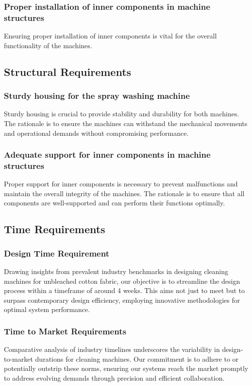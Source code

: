 \documentclass[12pt]{article} %
\begin{document}
 \subsubsection{Proper installation of inner components in machine structures} Ensuring proper installation of inner components is vital for the overall functionality of the machines.
 
\hspace{1cm}
\subsection{Structural Requirements}

 \subsubsection{Sturdy housing for the spray washing machine} Sturdy housing is crucial to provide stability and durability for both machines. The rationale is to ensure the machines can withstand the mechanical movements and operational demands without compromising performance.

 
 \subsubsection{Adequate support for inner components in machine structures} Proper support for inner components is necessary to prevent malfunctions and maintain the overall integrity of the machines. The rationale is to ensure that all components are well-supported and can perform their functions optimally.

\clearpage

\subsection{Time Requirements}

 \subsubsection{Design Time Requirement} Drawing insights from prevalent industry benchmarks in designing cleaning machines for unbleached cotton fabric, our objective is to streamline the design process within a timeframe of around 4 weeks. This aims not just to meet but to surpass contemporary design efficiency, employing innovative methodologies for optimal system performance.

 
 \subsubsection{Time to Market Requirements} Comparative analysis of industry timelines underscores the variability in design-to-market durations for cleaning machines. Our commitment is to adhere to or potentially outstrip these norms, ensuring our systems reach the market promptly to address evolving demands through precision and efficient collaboration.
\end{document}
